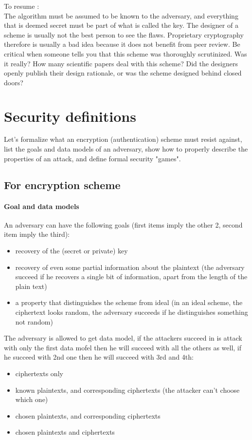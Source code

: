 \documentclass[11pt,a4paper]{report}
\begin{document}
To resume :\\
The algorithm must be assumed to be known to the adversary, and everything that is deemed secret must be part of what is called the key. 
The designer of a scheme is usually not the best person to see the flaws. Proprietary cryptography therefore is usually a bad idea because it does not benefit from peer review. 
Be critical when someone tells you that this scheme was thoroughly scrutinized. Was it really? How many scientific papers deal with this scheme? Did the designers openly publish their design rationale, or was the scheme designed behind closed doors?

\section{Security definitions}
Let's formalize what an encryption (authentication) scheme must resist against, list the goals and data models of an adversary, show how to properly describe the properties of an attack, and define formal security "games".\\
\subsection{For encryption scheme}
\paragraph{Goal and data models}
An adversary can have the following goals (first items imply the other 2, second item imply the third):
\begin{itemize}
\item recovery of the (secret or private) key
\item recovery of even some partial information about the plaintext (the adversary succeed if he recovers a single bit of information, apart from the length of the plain text)
\item a property that distinguishes the scheme from ideal (in an ideal scheme, the ciphertext looks random, the adversary succeeds if he distinguishes something not random)
\end{itemize}

The adversary is allowed to get data model, if the attackers succeed in is attack with only the first data mofel then he will succeed with all the others as well, if he succeed with 2nd one then he will succeed with 3rd and 4th:
\begin{itemize}
\item ciphertexts only
\item known plaintexts, and corresponding ciphertexts (the attacker can't choose which one)
\item chosen plaintexts, and corresponding ciphertexts
\item chosen plaintexts and ciphertexts
\end{itemize}
\end{document}
